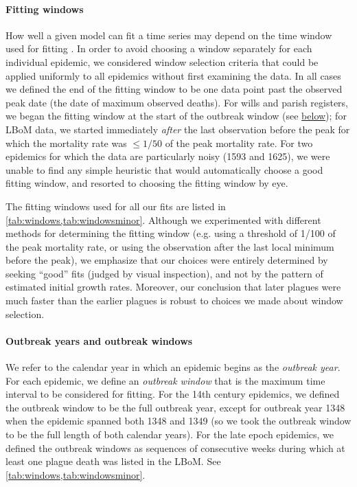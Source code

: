 \paragraph{Fitting windows}

How well a given model can fit a time series may depend on the time window used for fitting \cite{ChamEarn16}.  In order to avoid choosing a window separately for each individual epidemic, we considered window selection criteria that could be applied uniformly to all epidemics without first examining the data. In all cases we defined the end of the fitting window to be one data point past the observed peak date (the date of maximum observed deaths).  For wills and parish registers, we began the fitting window at the start of the outbreak window (see \hyperlink{outbreak.year}{below}); for LBoM data, we started immediately \emph{after} the last observation before the peak for which the mortality rate was $\le 1/50$ of the peak mortality rate. For two epidemics for which the data are particularly noisy (1593 and 1625), we were unable to find any simple heuristic that would automatically choose a good fitting window, and resorted to choosing the fitting window by eye.

The fitting windows used for all our fits are listed in \supp \cref{tab:windows,tab:windowsminor}. Although we experimented with different methods for determining the fitting window (e.g. using a threshold of 1/100 of the peak mortality rate, or using the observation after the last local minimum before the peak), 
we emphasize that our choices were entirely determined by seeking ``good'' fits (judged by visual inspection), and not by the pattern of estimated initial growth rates. Moreover, our conclusion that later plagues were much faster than the earlier plagues is robust to choices we made about window selection.

\hypertarget{outbreak.year}{}
\paragraph{Outbreak years and outbreak windows}

We refer to the calendar year in which an epidemic begins as the \emph{outbreak year}.  For each epidemic, we define an \emph{outbreak window} that is the maximum time interval to be considered for fitting.  For the 14th century epidemics, we defined the outbreak window to be the full outbreak year, except for outbreak year 1348 when the epidemic spanned both 1348 and 1349 (so we took the outbreak window to be the full length of both calendar years).  For the late epoch epidemics, we defined the outbreak windows as sequences of consecutive weeks during which at least one plague death was listed in the LBoM.  See \supp \cref{tab:windows,tab:windowsminor}.

